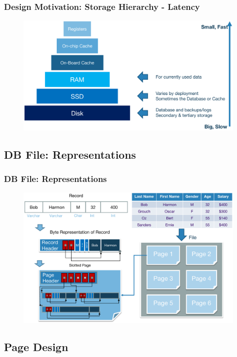 \begin{frame}[fragile]
	\frametitle{Design Motivation: Storage Hierarchy - Latency}
	\begin{figure}
		\includegraphics[width=0.85\linewidth]{figs/dbfile-latency2.pdf}
	\end{figure}
\end{frame}



\subsection{DB File: Representations}


\begin{frame}[fragile]
	\frametitle{DB File: Representations}
	\begin{figure}
		\includegraphics[width=0.75\linewidth]{figs/dbfile-representation.pdf}
	\end{figure}
\end{frame}


\subsection{Page Design}

